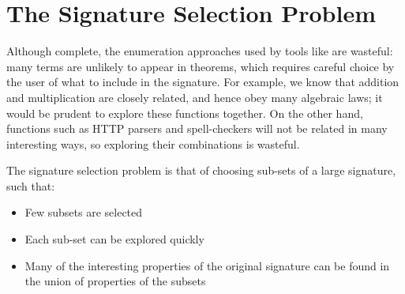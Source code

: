 \iffalse
Some bespoke components required for these analyses and comparisons may also be
useful on their own, or re-purposed for other tasks. These include:

\begin{enumerate}
\item A novel feature extraction method for transforming Haskell expressions
  into a form amenable to off-the-shelf machine-learning algorithms, based on
  the existing \emph{recurrent clustering} algorithm from other languages.
\item An executable implementation of this feature extraction
  approach\footnote{https://github.com/warbo/ml4hsfe}.
\item End-to-end automation for exploration arbitrary, user-provided Haskell
  packages\footnote{https://github.com/warbo/haskell-te}.
\item Dynamic evaluation of Haskell code, with access to dynamically installed
  Haskell packages\footnote{\hPackage{nix-eval}}.
\item Translation of the signature selection problem to the constrain-solving domain, and
  executable oracles for optimal (and pessimal) signature selection, when the desired
  properties are already known\footnote{Part of
    https://github.com/warbo/bucketing-algorithms}.
\end{enumerate}
\fi

\section{The Signature Selection Problem}
\label{sec:sigselect}

Although complete, the enumeration approaches used by tools like \quickspec{}
are wasteful: many terms are unlikely to appear in theorems, which requires
careful choice by the user of what to include in the signature. For example, we
know that addition and multiplication are closely related, and hence obey many
algebraic laws; it would be prudent to explore these functions together. On the
other hand, functions such as HTTP parsers and spell-checkers will not be
related in many interesting ways, so exploring their combinations is wasteful.

The signature selection problem is that of choosing sub-sets of a large
signature, such that:

\begin{itemize}
\item Few subsets are selected
\item Each sub-set can be explored quickly
\item Many of the interesting properties of the original signature can be
  found in the union of properties of the subsets
\end{itemize}


